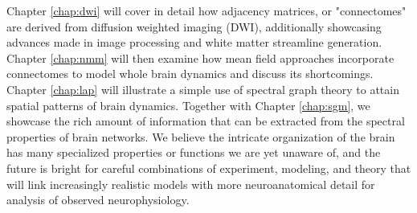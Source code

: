 Chapter \ref{chap:dwi} will cover in detail how adjacency matrices, or "connectomes" are derived from diffusion weighted imaging (DWI), additionally showcasing advances made in image processing and white matter streamline generation. Chapter \ref{chap:nmm} will then examine how mean field approaches incorporate connectomes to model whole brain dynamics and discuss its shortcomings. Chapter \ref{chap:lap} will illustrate a simple use of spectral graph theory to attain spatial patterns of brain dynamics. Together with Chapter \ref{chap:sgm}, we showcase the rich amount of information that can be extracted from the spectral properties of brain networks. We believe the intricate organization of the brain has many specialized properties or functions we are yet unaware of, and the future is bright for careful combinations of experiment, modeling, and theory that will link increasingly realistic models with more neuroanatomical detail for analysis of observed neurophysiology. 
